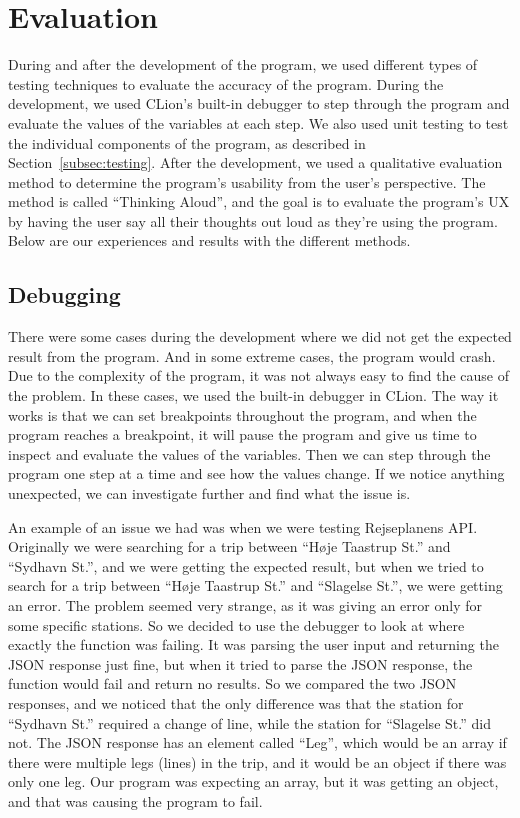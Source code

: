 \section{Evaluation}\label{sec:evaluation}

During and after the development of the program, we used different types of testing techniques to evaluate the accuracy
of the program.
During the development, we used CLion's built-in debugger to step through the program and evaluate the
values of the variables at each step.
We also used unit testing to test the individual components of the program, as described in
Section~\ref{subsec:testing}.
After the development, we used a qualitative evaluation method to determine the program's usability from the user's
perspective.
The method is called ``Thinking Aloud'', and the goal is to evaluate the program's UX by having the user say all their
thoughts out loud as they're using the program.
Below are our experiences and results with the different methods.

\subsection{Debugging}\label{subsec:debugging}

There were some cases during the development where we did not get the expected result from the program.
And in some extreme cases, the program would crash.
Due to the complexity of the program, it was not always easy to find the cause of the problem.
In these cases, we used the built-in debugger in CLion.
The way it works is that we can set breakpoints throughout the program, and when the program reaches a breakpoint, it
will pause the program and give us time to inspect and evaluate the values of the variables.
Then we can step through the program one step at a time and see how the values change.
If we notice anything unexpected, we can investigate further and find what the issue is.

An example of an issue we had was when we were testing Rejseplanens API.
Originally we were searching for a trip between ``Høje Taastrup St.'' and ``Sydhavn St.'', and we were getting the
expected result, but when we tried to search for a trip between ``Høje Taastrup St.'' and ``Slagelse St.'', we were
getting an error.
The problem seemed very strange, as it was giving an error only for some specific stations.
So we decided to use the debugger to look at where exactly the function was failing.
It was parsing the user input and returning the JSON response just fine, but when it tried to parse the JSON response,
the function would fail and return no results.
So we compared the two JSON responses, and we noticed that the only difference was that the station for ``Sydhavn St.''
required a change of line, while the station for ``Slagelse St.'' did not.
The JSON response has an element called ``Leg'', which would be an array if there were multiple legs (lines) in the
trip, and it would be an object if there was only one leg.
Our program was expecting an array, but it was getting an object, and that was causing the program to fail.

